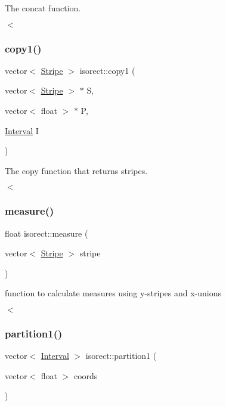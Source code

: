 The concat function. 

$<$ \mbox{\label{classisorect_aa9e8b006294ee85a378fbc061f1c4f2f}} 
\subsubsection{\texorpdfstring{copy1()}{copy1()}}
{\footnotesize\ttfamily vector$<$ \hyperlink{classStripe}{Stripe} $>$ isorect\+::copy1 (\begin{DoxyParamCaption}\item[{vector$<$ \hyperlink{classStripe}{Stripe} $>$ $\ast$}]{S,  }\item[{vector$<$ float $>$ $\ast$}]{P,  }\item[{\hyperlink{classInterval}{Interval}}]{I }\end{DoxyParamCaption})}



The copy function that returns stripes. 

$<$ \mbox{\label{classisorect_ae2478502a1adbae4ff7a95c889860b70}} 
\subsubsection{\texorpdfstring{measure()}{measure()}}
{\footnotesize\ttfamily float isorect\+::measure (\begin{DoxyParamCaption}\item[{vector$<$ \hyperlink{classStripe}{Stripe} $>$}]{stripe }\end{DoxyParamCaption})}



function to calculate measures using y-\/stripes and x-\/unions 

$<$ \mbox{\label{classisorect_ab488becc2518f42929ddec2468c60e9e}} 
\subsubsection{\texorpdfstring{partition1()}{partition1()}}
{\footnotesize\ttfamily vector$<$ \hyperlink{classInterval}{Interval} $>$ isorect\+::partition1 (\begin{DoxyParamCaption}\item[{vector$<$ float $>$}]{coords }\end{DoxyParamCaption})}



